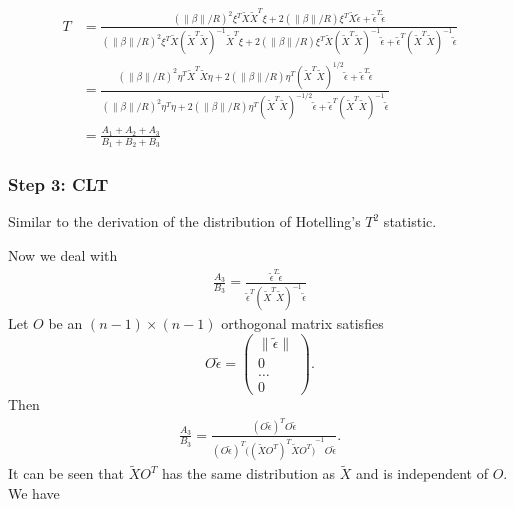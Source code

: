 \documentclass[review]{elsarticle}
\theoremstyle{plain}
\theoremstyle{definition}
\theoremstyle{remark}
\begin{document}
\begin{equation}
    \begin{aligned}
        T&=\frac{{(\|\beta\|/R)}^2\xi^T \tilde{X}\tilde{X}^T \xi+
        2(\|\beta\|/R)\xi^T \tilde{X}\tilde{\epsilon}+
        \tilde{\epsilon}^T\tilde{\epsilon}
    }{{(\|\beta\|/R)}^2\xi^T \tilde{X}{(\tilde{X}^T\tilde{X})}^{-1}\tilde{X}^T \xi+
        2(\|\beta\|/R)\xi^T \tilde{X}{(\tilde{X}^T\tilde{X})}^{-1}\tilde{\epsilon}+
        \tilde{\epsilon}^T{(\tilde{X}^T\tilde{X})}^{-1}\tilde{\epsilon}
    }\\
        &=
        \frac{{(\|\beta\|/R)}^2\eta^T \tilde{X}^T\tilde{X} \eta+
        2(\|\beta\|/R)\eta^T {(\tilde{X}^T\tilde{X})}^{1/2}\tilde{\epsilon}+
        \tilde{\epsilon}^T\tilde{\epsilon}
    }{{(\|\beta\|/R)}^2\eta^T\eta+
        2(\|\beta\|/R)\eta^T{(\tilde{X}^T\tilde{X})}^{-1/2}\tilde{\epsilon}+
        \tilde{\epsilon}^T{(\tilde{X}^T\tilde{X})}^{-1}\tilde{\epsilon}
    }\\
        &=\frac{A_1+A_2+A_3}{B_1+B_2+B_3}
    \end{aligned}
\end{equation}


\subsubsection{Step 3: CLT}
Similar to the derivation of the distribution of Hotelling's $T^2$ statistic.

Now we deal with 
\begin{equation}
    \begin{aligned}
        \frac{A_3}{B_3}=\frac{\tilde{\epsilon}^T\tilde{\epsilon}
    }{\tilde{\epsilon}^T{(\tilde{X}^T\tilde{X})}^{-1}\tilde{\epsilon}
        }
    \end{aligned}
\end{equation}
Let $O$ be an $(n-1)\times (n-1)$ orthogonal matrix satisfies 
\[
    O\tilde{\epsilon}=
    \begin{pmatrix}
        \|\tilde{\epsilon}\|\\
        0\\
        \ldots\\
        0
    \end{pmatrix}.
    \]
Then
\begin{equation}
    \begin{aligned}
        \frac{A_3}{B_3}=\frac{{(O\tilde{\epsilon})}^T O\tilde{\epsilon}
        }{{(O\tilde{\epsilon})}^T{\big({(\tilde{X}O^T)}^T\tilde{X}O^T\big)}^{-1} O\tilde{\epsilon}
        }.
    \end{aligned}
\end{equation}
It can be seen that $\tilde{X}O^T$ has the same distribution as $\tilde{X}$ and is independent of $O$. We have
\end{document}
